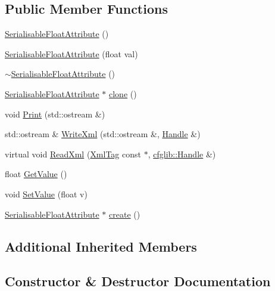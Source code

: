 \subsection*{Public Member Functions}
\begin{DoxyCompactItemize}
\item 
\hyperlink{classcfglib_1_1SerialisableFloatAttribute_ab6405145d5601d941b9f4d7899e1301e}{Serialisable\+Float\+Attribute} ()
\item 
\hyperlink{classcfglib_1_1SerialisableFloatAttribute_aee912a7511215f8c2308da08f7b852c5}{Serialisable\+Float\+Attribute} (float val)
\item 
\hyperlink{classcfglib_1_1SerialisableFloatAttribute_ab60b6f3fc7ce73b5ad61339fa2466b57}{$\sim$\+Serialisable\+Float\+Attribute} ()
\item 
\hyperlink{classcfglib_1_1SerialisableFloatAttribute}{Serialisable\+Float\+Attribute} $\ast$ \hyperlink{classcfglib_1_1SerialisableFloatAttribute_a2addfc6e4ad308e1e84c2b4cdac7636b}{clone} ()
\item 
void \hyperlink{classcfglib_1_1SerialisableFloatAttribute_af36f296204e1a8547f3fbef7ec4c23da}{Print} (std\+::ostream \&)
\item 
std\+::ostream \& \hyperlink{classcfglib_1_1SerialisableFloatAttribute_a6955df1fc620fa672d29d4e2426a6c89}{Write\+Xml} (std\+::ostream \&, \hyperlink{classcfglib_1_1Handle}{Handle} \&)
\item 
virtual void \hyperlink{classcfglib_1_1SerialisableFloatAttribute_a622fedde5c15cc5fe891d57c932d5355}{Read\+Xml} (\hyperlink{classXmlTag}{Xml\+Tag} const $\ast$, \hyperlink{classcfglib_1_1Handle}{cfglib\+::\+Handle} \&)
\item 
float \hyperlink{classcfglib_1_1SerialisableFloatAttribute_a820299e89405d3c13b300688778e4a85}{Get\+Value} ()
\item 
void \hyperlink{classcfglib_1_1SerialisableFloatAttribute_ae53727839365c40f44883abeaa38c9f5}{Set\+Value} (float v)
\item 
\hyperlink{classcfglib_1_1SerialisableFloatAttribute}{Serialisable\+Float\+Attribute} $\ast$ \hyperlink{classcfglib_1_1SerialisableFloatAttribute_a47205df866697eb0af48be24f1a0fe5b}{create} ()
\end{DoxyCompactItemize}
\subsection*{Additional Inherited Members}


\subsection{Constructor \& Destructor Documentation}
\mbox{\label{classcfglib_1_1SerialisableFloatAttribute_ab6405145d5601d941b9f4d7899e1301e}} 

